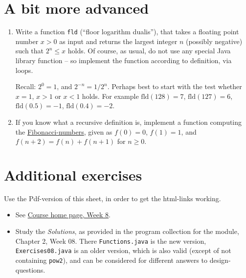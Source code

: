 \documentclass[11pt]{article}
\begin{document}
\section{A bit more advanced}
\label{sec:advanced}

\begin{enumerate}
\item Write a function \texttt{fld} (``floor logarithm dualis''), that takes a floating point number $x > 0$ as input and returns the largest integer $n$ (possibly negative) such that $2^n \le x$ holds. Of course, as usual, do not use any special Java library function -- so implement the function according to definition, via loops.

  Recall: $2^0 = 1$, and $2^{-n} = 1 / 2^n$. Perhaps best to start with the test whether $x = 1$, $x > 1$ or $x < 1$ holds. For example $\mathrm{fld}(128) = 7$, $\mathrm{fld}(127) = 6$, $\mathrm{fld}(0.5) = -1$, $\mathrm{fld}(0.4) = -2$.
\item If you know what a recursive definition is, implement a function computing the \href{https://en.wikipedia.org/wiki/Fibonacci_number}{Fibonacci-numbers}, given as $f(0) = 0$, $f(1) = 1$, and $f(n+2) = f(n) + f(n+1)$ for $n \ge 0$.
\end{enumerate}

\section{Additional exercises}
\label{sec:addex}

Use the Pdf-version of this sheet, in order to get the html-links working.
\begin{itemize}
\item See \href{\chp#ExercisesWeek08}{Course home page, Week 8}.
\item Study the \emph{Solutions}, as provided in the program collection for the module, Chapter 2, Week 08. There \texttt{Functions.java} is the new version, \texttt{Exercises08.java} is an older version, which is also valid (except of not containing \texttt{pow2}), and can be considered for different answers to design-questions.
\end{itemize}
\end{document}
